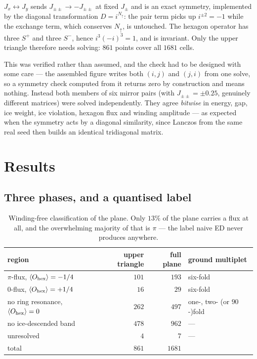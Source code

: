 \documentclass[11pt]{article}
\newcommand{\Jpm}{J_{\pm}}
\newcommand{\Jpmpm}{J_{\pm\pm}}
\newcommand{\Ohex}{O_{\rm hex}}
\begin{document}
$J_x\leftrightarrow J_y$ sends $\Jpmpm\to-\Jpmpm$ at fixed $\Jpm$ and is an
exact symmetry, implemented by the diagonal transformation
$D=i^{N_\uparrow}$: the pair term picks up $i^{\pm2}=-1$ while the exchange
term, which conserves $N_\uparrow$, is untouched.  The hexagon operator has
three $S^+$ and three $S^-$, hence $i^3(-i)^3=1$, and is invariant.  Only
the upper triangle therefore needs solving: $861$ points cover all $1681$
cells.

This was verified rather than assumed, and the check had to be designed
with some care --- the assembled figure writes both $(i,j)$ and $(j,i)$
from one solve, so a symmetry check computed from it returns zero by
construction and means nothing.  Instead both members of six mirror pairs
(with $\Jpmpm=\pm0.25$, genuinely different matrices) were solved
independently.  They agree \emph{bitwise} in energy, gap, ice weight, ice
violation, hexagon flux and winding amplitude --- as expected when the
symmetry acts by a diagonal similarity, since Lanczos from the same real
seed then builds an identical tridiagonal matrix.

\section{Results}

\subsection{Three phases, and a quantised label}

\begin{table}[h]
\centering
\small
\begin{tabular}{lrrl}
\toprule
region & upper triangle & full plane & ground multiplet\\
\midrule
$\pi$-flux, $\langle\Ohex\rangle=-1/4$ & $101$ & $193$ & six-fold\\
$0$-flux, $\langle\Ohex\rangle=+1/4$ & $16$ & $29$ & six-fold\\
no ring resonance, $\langle\Ohex\rangle=0$ & $262$ & $497$ & one-, two- (or $90$-)fold\\
no ice-descended band & $478$ & $962$ & ---\\
unresolved & $4$ & $7$ & ---\\
\midrule
total & $861$ & $1681$ & \\
\bottomrule
\end{tabular}
\caption{Winding-free classification of the plane.  Only $13\%$ of the
plane carries a flux at all, and the overwhelming majority of that is
$\pi$ --- the label naive ED never produces anywhere.}
\label{tab:phases}
\end{table}
\end{document}
